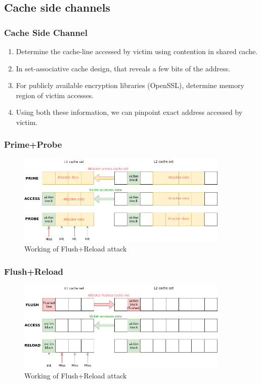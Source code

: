 \documentclass[10pt]{beamer}
\begin{document}
\subsection{Cache side channels}
\begin{frame}
\frametitle{Cache Side Channel}
\begin{enumerate}
    \item Determine the cache-line accessed by victim using contention in shared cache.
    \item In set-associative cache design, that reveals a few bits of the address.
    \item For publicly available encryption libraries (OpenSSL), determine memory region of victim accesses.
    \item Using both these information, we can pinpoint exact address accessed by victim.
\end{enumerate}
\end{frame}

\begin{frame}
\frametitle{Prime+Probe}
\begin{figure}
\includegraphics[width=0.9\textwidth]{figures/prime_probe}
\caption{Working of Flush+Reload attack}
\end{figure}
\end{frame}

\begin{frame}
\frametitle{Flush+Reload}
\begin{figure}
\includegraphics[width=0.9\textwidth]{figures/flush_reload}
\caption{Working of Flush+Reload attack}
\end{figure}
\end{frame}
\end{document}
